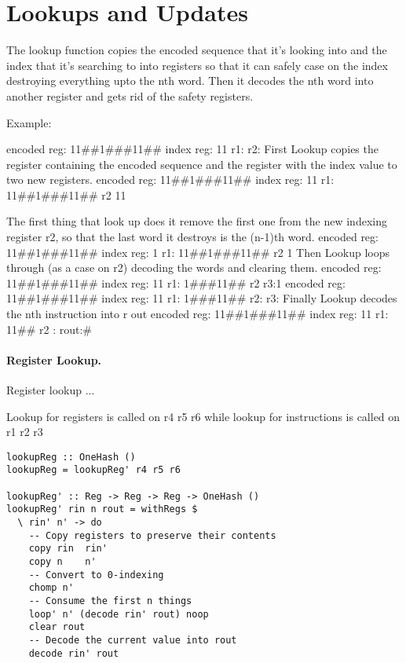 \documentclass[10pt, preprint, nocopyrightspace]{sigplanconf}
\begin{document}
\section{Lookups and Updates}

The lookup function copies the encoded sequence that it’s looking into and the
index that it’s searching to into registers so that it can safely case on the
index destroying everything upto the nth word. Then it decodes the nth word
into another register and gets rid of the safety registers. 

Example: 

encoded reg: 11\#\#1\#\#\#11\#\#
index reg: 11
r1:
r2:
First Lookup copies the register containing the encoded sequence and the register with the index value to two new registers. 
 encoded reg: 11\#\#1\#\#\#11\#\#
index reg: 11
r1: 11\#\#1\#\#\#11\#\#
r2 11

The first thing that look up does it remove the first one from the new indexing register r2, so that the last word it destroys is the (n-1)th word.  
 encoded reg: 11\#\#1\#\#\#11\#\#
index reg: 1
r1: 11\#\#1\#\#\#11\#\#
r2 1
Then Lookup loops through (as a case on r2) decoding the words and clearing them.
 encoded reg: 11\#\#1\#\#\#11\#\#
index reg: 11
r1: 1\#\#\#11\#\#
r2 
r3:1
encoded reg: 11\#\#1\#\#\#11\#\#
index reg: 11
r1: 1\#\#\#11\#\#
r2:
r3:
Finally Lookup decodes the nth instruction into r out
 encoded reg: 11\#\#1\#\#\#11\#\#
index reg: 11
r1: 11\#\#
r2 :
rout:\#




\paragraph{Register Lookup.}

Register lookup ...

Lookup for registers is called on r4 r5 r6 while lookup for instructions is called on  r1 r2 r3

\begin{lstlisting}
lookupReg :: OneHash ()
lookupReg = lookupReg' r4 r5 r6

lookupReg' :: Reg -> Reg -> Reg -> OneHash ()
lookupReg' rin n rout = withRegs $
  \ rin' n' -> do
    -- Copy registers to preserve their contents
    copy rin  rin'
    copy n    n'
    -- Convert to 0-indexing
    chomp n'
    -- Consume the first n things
    loop' n' (decode rin' rout) noop
    clear rout
    -- Decode the current value into rout
    decode rin' rout
\end{lstlisting}
\end{document}
